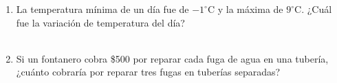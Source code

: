 \documentclass[11pt,letterpaper]{article}
\newenvironment{alternativas}{%
\begin{enumerate}[label=\Alph*), leftmargin=14pt, itemsep=2pt, topsep=2pt]
}{\end{enumerate}}
\begin{document}
\begin{enumerate}[label=\textbf{\arabic*.}, leftmargin=*, itemsep=7pt]
\item
\begin{minipage}[t]{\linewidth}
La temperatura mínima de un día fue de $-1^\circ\mathrm{C}$ y la máxima de $9^\circ\mathrm{C}$. ¿Cuál fue la variación de temperatura del día?\\
\\%
\begin{minipage}{\linewidth}
\vspace{7mm}
\end{minipage}
\vspace{7mm}
\end{minipage}

\item
\begin{minipage}[t]{\linewidth}
Si un fontanero cobra \$500 por reparar cada fuga de agua en una tubería, ¿cuánto cobraría por reparar tres fugas en tuberías separadas?\\
\\%
\begin{minipage}{\linewidth}
\vspace{7mm}
\end{minipage}
\vspace{7mm}
\end{minipage}


\end{enumerate}
\end{document}
